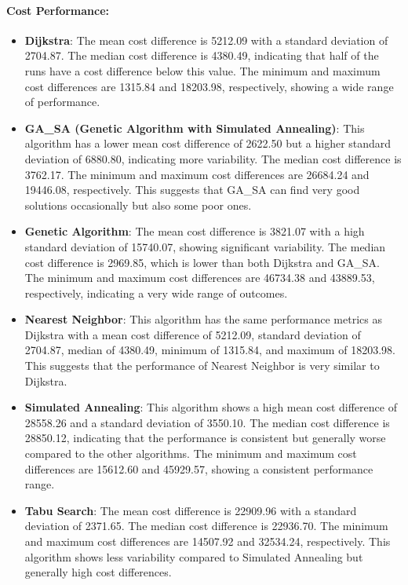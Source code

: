 \documentclass{article}
\begin{document}
    \paragraph{Cost Performance:}
    \begin{itemize}
        \item \textbf{Dijkstra}: The mean cost difference is 5212.09 with a standard deviation of 2704.87. The median cost difference is 4380.49, indicating that half of the runs have a cost difference below this value. The minimum and maximum cost differences are 1315.84 and 18203.98, respectively, showing a wide range of performance.
        \item \textbf{GA\_SA (Genetic Algorithm with Simulated Annealing)}: This algorithm has a lower mean cost difference of 2622.50 but a higher standard deviation of 6880.80, indicating more variability. The median cost difference is 3762.17. The minimum and maximum cost differences are 26684.24 and 19446.08, respectively. This suggests that GA\_SA can find very good solutions occasionally but also some poor ones.
        \item \textbf{Genetic Algorithm}: The mean cost difference is 3821.07 with a high standard deviation of 15740.07, showing significant variability. The median cost difference is 2969.85, which is lower than both Dijkstra and GA\_SA. The minimum and maximum cost differences are 46734.38 and 43889.53, respectively, indicating a very wide range of outcomes.
        \item \textbf{Nearest Neighbor}: This algorithm has the same performance metrics as Dijkstra with a mean cost difference of 5212.09, standard deviation of 2704.87, median of 4380.49, minimum of 1315.84, and maximum of 18203.98. This suggests that the performance of Nearest Neighbor is very similar to Dijkstra.
        \item \textbf{Simulated Annealing}: This algorithm shows a high mean cost difference of 28558.26 and a standard deviation of 3550.10. The median cost difference is 28850.12, indicating that the performance is consistent but generally worse compared to the other algorithms. The minimum and maximum cost differences are 15612.60 and 45929.57, showing a consistent performance range.
        \item \textbf{Tabu Search}: The mean cost difference is 22909.96 with a standard deviation of 2371.65. The median cost difference is 22936.70. The minimum and maximum cost differences are 14507.92 and 32534.24, respectively. This algorithm shows less variability compared to Simulated Annealing but generally high cost differences.
    \end{itemize}
\end{document}
